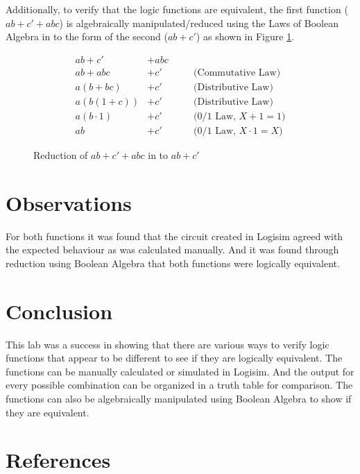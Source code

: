 \documentclass[12pt]{article}
\begin{document}
Additionally, to verify that the logic functions are equivalent,
the first function ($a b + c' + a b c$) is algebraically manipulated/reduced
using the Laws of Boolean Algebra \cite[Pg. 55]{roth2009fundamentals}
in to the form of the second ($a b + c'$) as shown in Figure \ref{fig:red}.

\begin{figure}
\begin{align*}
a b + c' &+ abc 	&& \\
a b + abc &+ c' 	&& \quad \mbox{(Commutative Law)} \\
a (b + bc) &+ c' 	&& \quad \mbox{(Distributive Law)} \\
a (b (1 + c)) &+ c' && \quad \mbox{(Distributive Law)} \\
a (b \cdot 1) &+ c' 		&& \quad \mbox{($0/1$ Law, $X + 1 = 1$)} \\
a b &+ c' 			&& \quad \mbox{($0/1$ Law, $X \cdot 1 = X$)}
\end{align*}

\caption{Reduction of $ab + c' + abc$ in to $ab + c'$}
\label{fig:red}
\end{figure}

\section{Observations}

For both functions it was found that the circuit created in Logisim
agreed with the expected behaviour as was calculated manually.
And it was found through reduction using Boolean Algebra that
both functions were logically equivalent.


\section{Conclusion}

This lab was a success in showing that there are various ways to
verify logic functions that appear to be different to see if they
are logically equivalent.
The functions can be manually calculated or simulated in Logisim.
And the output for every possible combination can be organized
in a truth table for comparison.
The functions can also be algebraically manipulated using Boolean Algebra
to show if they are equivalent.


\renewcommand*{\refname}{\vspace{-8mm}}
\section{References}
%
%



\end{document}
